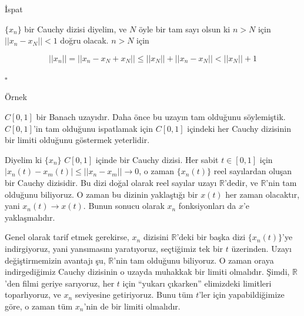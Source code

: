 \documentclass[12pt,fleqn]{article}\usepackage{../../common}
\begin{document}
İspat

$\{x_n\}$ bir Cauchy dizisi diyelim, ve $N$ öyle bir tam sayı olsun ki $n >
N$ için $||x_n - x_N|| < 1$ doğru olacak. $n > N$ için

$$ ||x_n|| = ||x_n - x_N + x_N || \le ||x_N|| + ||x_n - x_N|| < ||x_N|| + 1 $$

$\square$

Örnek

$C[0,1]$ bir Banach uzayıdır. Daha önce bu uzayın tam olduğunu
söylemiştik. $C[0,1]$'in tam olduğunu ispatlamak için $C[0,1]$ içindeki her
Cauchy dizisinin bir limiti olduğunu göstermek yeterlidir. 

Diyelim ki $\{x_n\}$ $C[0,1]$ içinde bir Cauchy dizisi. Her sabit $t \in
[0,1]$ için $|x_n(t) - x_m(t)| \le ||x_n - x_m|| \to 0$, o zaman  $\{x_n(t)\}$
reel sayılardan oluşan bir Cauchy dizisidir. Bu dizi doğal olarak reel
sayılar uzayı $\mathbb{R}$'dedir, ve $\mathbb{R}$'nin tam olduğunu
biliyoruz. O zaman bu dizinin yaklaştığı bir $x(t)$ her zaman olacaktır,
yani $x_n(t) \to x(t)$. Bunun sonucu olarak $x_n$ fonksiyonları da $x$'e
yaklaşmalıdır. 

Genel olarak tarif etmek gerekirse, $x_n$ dizisini $\mathbb{R}$'deki bir
başka dizi $\{x_n(t)\}$'ye indirgiyoruz, yani yansımasını yaratıyoruz,
seçtiğimiz tek bir $t$ üzerinden. Uzayı değiştirmemizin avantajı şu,
$\mathbb{R}$'nin tam olduğunu biliyoruz. O zaman oraya indirgediğimiz
Cauchy dizisinin o uzayda muhakkak bir limiti olmalıdır. Şimdi,
$\mathbb{R}$'den filmi geriye sarıyoruz, her $t$ için ``yukarı çıkarken''
elimizdeki limitleri toparlıyoruz, ve $x_n$ seviyesine getiriyoruz. Bunu
tüm $t$'ler için yapabildiğimize göre, o zaman tüm $x_n$'nin de bir limiti
olmalıdır.
\end{document}
